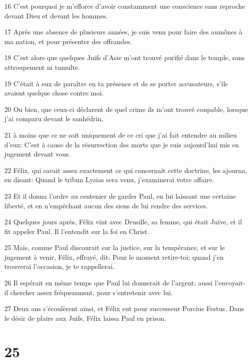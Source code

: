 \par 16 C'est pourquoi je m'efforce d'avoir constamment une conscience sans reproche devant Dieu et devant les hommes.
\par 17 Après une absence de plusieurs années, je suis venu pour faire des aumônes à ma nation, et pour présenter des offrandes.
\par 18 C'est alors que quelques Juifs d'Asie m'ont trouvé purifié dans le temple, sans attroupement ni tumulte.
\par 19 C'était à eux de paraître en ta présence et de se porter accusateurs, s'ils avaient quelque chose contre moi.
\par 20 Ou bien, que ceux-ci déclarent de quel crime ils m'ont trouvé coupable, lorsque j'ai comparu devant le sanhédrin,
\par 21 à moins que ce ne soit uniquement de ce cri que j'ai fait entendre au milieu d'eux: C'est à cause de la résurrection des morts que je suis aujourd'hui mis en jugement devant vous.
\par 22 Félix, qui savait assez exactement ce qui concernait cette doctrine, les ajourna, en disant: Quand le tribun Lysias sera venu, j'examinerai votre affaire.
\par 23 Et il donna l'ordre au centenier de garder Paul, en lui laissant une certaine liberté, et en n'empêchant aucun des siens de lui rendre des services.
\par 24 Quelques jours après, Félix vint avec Drusille, sa femme, qui était Juive, et il fit appeler Paul. Il l'entendit sur la foi en Christ.
\par 25 Mais, comme Paul discourait sur la justice, sur la tempérance, et sur le jugement à venir, Félix, effrayé, dit: Pour le moment retire-toi; quand j'en trouverai l'occasion, je te rappellerai.
\par 26 Il espérait en même temps que Paul lui donnerait de l'argent; aussi l'envoyait-il chercher assez fréquemment, pour s'entretenir avec lui.
\par 27 Deux ans s'écoulèrent ainsi, et Félix eut pour successeur Porcius Festus. Dans le désir de plaire aux Juifs, Félix laissa Paul en prison.

\chapter{25}

